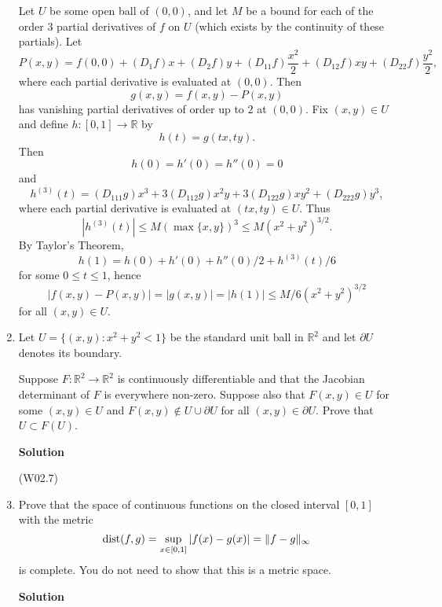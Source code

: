 \documentclass{article}
\def\dist{\mathop{\rm dist}\nolimits}
\begin{document}
\begin{enumerate}
Let \(U\) be some open ball of \((0,0)\), and let \(M\) be a bound for each of the order \(3\) partial derivatives of \(f\) on \(U\) (which exists by the continuity of these partials).  Let
\[P(x,y) = f(0,0) + (D_1f)x + (D_2f)y + (D_{11}f) \frac{x^2}{2} + (D_{12}f)xy + (D_{22}f) \frac{y^2}{2},\]
where each partial derivative is evaluated at \((0,0)\).  Then
\[g(x,y) = f(x,y) - P(x,y)\]
has vanishing partial derivatives of order up to \(2\) at \((0,0)\).  Fix \((x,y) \in U\) and define \(h : [0,1] \to \mathbb{R}\) by
\[h(t) = g(tx,ty).\]
Then
\[h(0) = h'(0) = h''(0) = 0\]
and
\[h^{(3)}(t) = (D_{111}g)x^3 + 3(D_{112}g)x^2y + 3(D_{122}g)xy^2 + (D_{222}g)y^3,\]
where each partial derivative is evaluated at \((tx,ty) \in U\).  Thus
\[\left| h^{(3)}(t) \right| \leq M \left( \max \{x,y\} \right)^3
                            \leq M \left( x^2 + y^2 \right)^{3/2}.\]
By Taylor's Theorem,
\[h(1) = h(0) + h'(0) + h''(0)/2 + h^{(3)}(t)/6\]
for some \(0 \leq t \leq 1\), hence
\[|f(x,y) - P(x,y)| = |g(x,y)| = |h(1)| \leq M/6 \left( x^2 + y^2 \right)^{3/2}\]
for all \((x,y) \in U\).



\item Let \(U = \{(x,y) : x^2 + y^2 < 1\}\) be the standard unit ball in \(\mathbb{R}^2\) and let \(\partial U\) denotes its boundary.

Suppose \(F : \mathbb{R}^2 \to \mathbb{R}^2\) is continuously differentiable and that the Jacobian determinant of \(F\) is everywhere non-zero.  Suppose also that \(F(x,y) \in U\) for some \((x,y) \in U\) and \(F(x,y) \notin U \cup \partial U\) for all \((x,y) \in \partial U\).  Prove that \(U \subset F(U)\).

{\bf Solution}

(W02.7)



\item Prove that the space of continuous functions on the closed interval \([0,1]\) with the metric
\[\dist(f,g) = \sup_{x \in [0,1]} |f(x) - g(x)| = \|f - g\|_{\infty}\]
is complete.  You do not need to show that this is a metric space.

{\bf Solution}


\end{enumerate}
\end{document}
